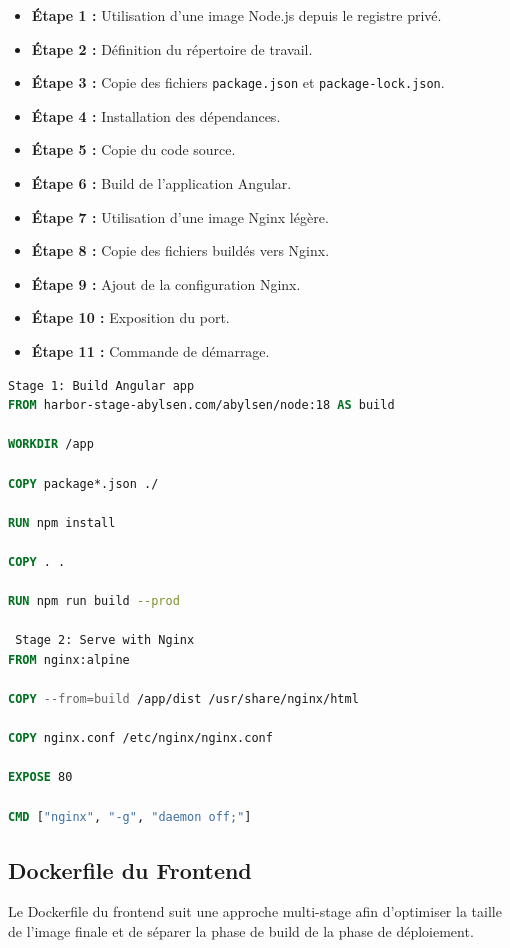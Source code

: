 \begin{itemize}
    \item \textbf{Étape 1 :} Utilisation d'une image Node.js depuis le registre privé.
    \item \textbf{Étape 2 :} Définition du répertoire de travail.
    \item \textbf{Étape 3 :} Copie des fichiers \texttt{package.json} et \texttt{package-lock.json}.
    \item \textbf{Étape 4 :} Installation des dépendances.
    \item \textbf{Étape 5 :} Copie du code source.
    \item \textbf{Étape 6 :} Build de l’application Angular.
    \item \textbf{Étape 7 :} Utilisation d'une image Nginx légère.
    \item \textbf{Étape 8 :} Copie des fichiers buildés vers Nginx.
    \item \textbf{Étape 9 :} Ajout de la configuration Nginx.
    \item \textbf{Étape 10 :} Exposition du port.
    \item \textbf{Étape 11 :} Commande de démarrage.
\end{itemize}

\begin{lstlisting}[language=Dockerfile, caption=Dockerfile du Frontend]
 Stage 1: Build Angular app
FROM harbor-stage-abylsen.com/abylsen/node:18 AS build

WORKDIR /app

COPY package*.json ./

RUN npm install

COPY . .

RUN npm run build --prod

 Stage 2: Serve with Nginx
FROM nginx:alpine

COPY --from=build /app/dist /usr/share/nginx/html

COPY nginx.conf /etc/nginx/nginx.conf

EXPOSE 80

CMD ["nginx", "-g", "daemon off;"]
\end{lstlisting}
\subsection*{Dockerfile du Frontend}

Le Dockerfile du frontend suit une approche multi-stage afin d’optimiser la taille de l’image finale et de séparer la phase de build de la phase de déploiement.


